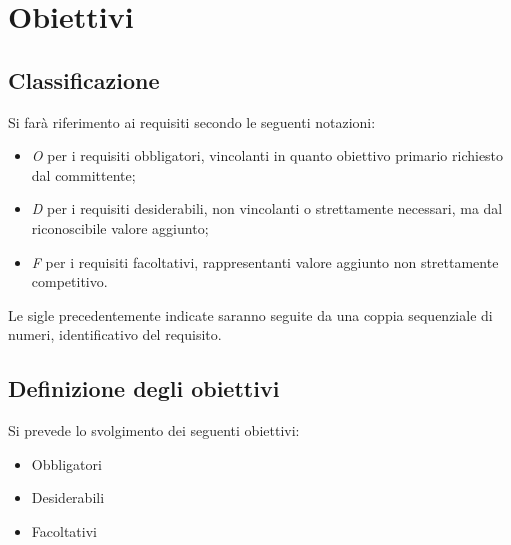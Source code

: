 \section{Obiettivi}
\subsection{Classificazione}
Si farà riferimento ai requisiti secondo le seguenti notazioni:
\begin{itemize}
	\item \textit{O} per i requisiti obbligatori, vincolanti in quanto obiettivo primario richiesto dal committente;
	\item \textit{D} per i requisiti desiderabili, non vincolanti o strettamente necessari,
		  ma dal riconoscibile valore aggiunto;
	\item \textit{F} per i requisiti facoltativi, rappresentanti valore aggiunto non strettamente 
		  competitivo.
\end{itemize}

Le sigle precedentemente indicate saranno seguite da una coppia sequenziale di numeri, identificativo del requisito.

\subsection{Definizione degli obiettivi}
Si prevede lo svolgimento dei seguenti obiettivi:
\begin{itemize}
	\item Obbligatori
	\begin{itemize}
		\obiettiviObbligatori
	\end{itemize}
	
	\item Desiderabili 
	\begin{itemize}
		\obiettiviDesiderabili
	\end{itemize}
	
	\item Facoltativi
	\begin{itemize}
		\obiettiviFacoltativi
	\end{itemize} 
\end{itemize}

\newpage